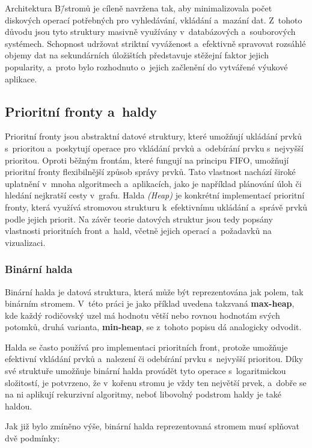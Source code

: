 Architektura B\=/stromů je cíleně navržena tak, aby minimalizovala počet diskových operací potřebných pro vyhledávání, vkládání a~mazání dat.
Z~tohoto důvodu jsou tyto struktury masivně využívány v~databázových a~souborových systémech.
Schopnost udržovat striktní vyváženost a~efektivně spravovat rozsáhlé objemy dat na sekundárních úložištích představuje stěžejní faktor jejich popularity, a~proto bylo rozhodnuto o~jejich začlenění do vytvářené výukové aplikace.

\subsection{Prioritní fronty a~haldy}
\label{sec:priority_queues}

Prioritní fronty jsou abstraktní datové struktury, které umožňují ukládání prvků s~prioritou a~poskytují operace pro vkládání prvků a~odebírání prvku s~nejvyšší prioritou.
Oproti běžným frontám, které fungují na principu FIFO, umožňují prioritní fronty flexibilnější způsob správy prvků.
Tato vlastnost nachází široké uplatnění v~mnoha algoritmech a~aplikacích, jako je například plánování úloh či hledání nejkratší cesty v~grafu.
Halda \textit{(Heap)} je konkrétní implementací prioritní fronty, která využívá stromovou strukturu k~efektivnímu ukládání a~správě prvků podle jejich priorit.
Na závěr teorie datových struktur jsou tedy popsány vlastnosti prioritních front a~hald, včetně jejich operací a~požadavků na vizualizaci.

\subsubsection*{Binární halda}

Binární halda je datová struktura, která může být reprezentována jak polem, tak binárním stromem.
V~této práci je jako příklad uvedena takzvaná \textbf{max-heap}, kde každý rodičovský uzel má hodnotu větší nebo rovnou hodnotám svých potomků, druhá varianta, \textbf{min-heap}, se z~tohoto popisu dá analogicky odvodit.

Halda se často používá pro implementaci prioritních front, protože umožňuje efektivní vkládání prvků a~nalezení či odebírání prvku s~nejvyšší prioritou.
Díky své struktuře umožňuje binární halda provádět tyto operace s~logaritmickou složitostí, je potvrzeno, že v~kořenu stromu je vždy ten největší prvek, a~dobře se na ni aplikují rekurzivní algoritmy, neboť libovolný podstrom haldy je také haldou.~\cite{levitin}

Jak již bylo zmíněno výše, binární halda reprezentovaná stromem musí splňovat dvě podmínky:

